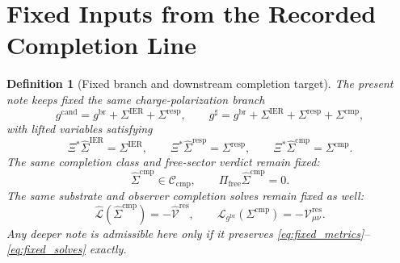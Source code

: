 \documentclass[11pt]{article}
\newcommand{\ObserverMap}{\Xi}
\newcommand{\ObserverMetric}{g^{\mathrm{br}}}
\newcommand{\CandidateMetric}{g^{\mathrm{cand}}}
\newcommand{\CompletedMetric}{g^{\sharp}}
\newcommand{\BaseShift}{\Sigma^{\mathrm{IER}}}
\newcommand{\ResponseShift}{\Sigma^{\mathrm{resp}}}
\newcommand{\CompShift}{\Sigma^{\mathrm{cmp}}}
\newcommand{\BaseLift}{\widehat\Sigma^{\mathrm{IER}}}
\newcommand{\ResponseLift}{\widehat\Sigma^{\mathrm{resp}}}
\newcommand{\CompLift}{\widehat\Sigma^{\mathrm{cmp}}}
\newcommand{\ResidualCore}{\mathcal V_{\mu\nu}^{\mathrm{res}}}
\newcommand{\ResidualLift}{\widehat{\mathcal V}^{\mathrm{res}}}
\newcommand{\SubReducedEin}{\widehat{\mathcal L}}
\newcommand{\FreeProj}{\Pi_{\mathrm{free}}}
\newcommand{\ReducedEin}{\mathcal L_{\ObserverMetric}}
\newcommand{\CompClass}{\mathscr C_{\mathrm{cmp}}}
\newtheorem{definition}{Definition}
\begin{document}
\section{Fixed Inputs from the Recorded Completion Line}

\begin{definition}[Fixed branch and downstream completion target]
\label{def:fixed_branch}
The present note keeps fixed the same charge-polarization branch
\begin{equation}
\CandidateMetric
=
\ObserverMetric+\BaseShift+\ResponseShift,
\qquad
\CompletedMetric
=
\ObserverMetric+\BaseShift+\ResponseShift+\CompShift,
\label{eq:fixed_metrics}
\end{equation}
with lifted variables satisfying
\begin{equation}
\ObserverMap^*\BaseLift=\BaseShift,
\qquad
\ObserverMap^*\ResponseLift=\ResponseShift,
\qquad
\ObserverMap^*\CompLift=\CompShift.
\label{eq:fixed_lifts}
\end{equation}
The same completion class and free-sector verdict remain fixed:
\begin{equation}
\CompLift\in\CompClass,
\qquad
\FreeProj\CompLift=0.
\label{eq:fixed_free}
\end{equation}
The same substrate and observer completion solves remain fixed as well:
\begin{equation}
\SubReducedEin(\CompLift)=-\ResidualLift,
\qquad
\ReducedEin(\CompShift)=-\ResidualCore.
\label{eq:fixed_solves}
\end{equation}
Any deeper note is admissible here only if it preserves \eqref{eq:fixed_metrics}--\eqref{eq:fixed_solves} exactly.
\end{definition}
\end{document}
